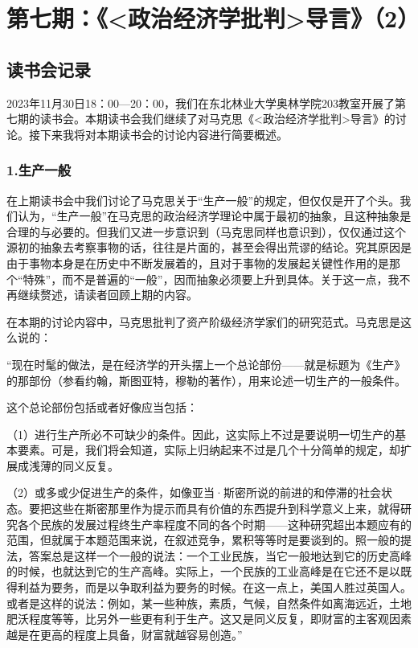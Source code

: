 \documentclass[a4paper,twoside,12pt,AutoFakeBold]{ctexart}
\begin{document}
\section{第七期：《<政治经济学批判>导言》（2）}
\subsection{读书会记录}
2023年11月30日18：00—20：00，我们在东北林业大学奥林学院203教室开展了第七期的读书会。本期读书会我们继续了对马克思《<政治经济学批判>导言》的讨论。接下来我将对本期读书会的讨论内容进行简要概述。
\subsubsection{1.生产一般}
在上期读书会中我们讨论了马克思关于“生产一般”的规定，但仅仅是开了个头。我们认为，“生产一般”在马克思的政治经济学理论中属于最初的抽象，且这种抽象是合理的与必要的。但我们又进一步意识到（马克思同样也意识到），仅仅通过这个源初的抽象去考察事物的话，往往是片面的，甚至会得出荒谬的结论。究其原因是由于事物本身是在历史中不断发展着的，且对于事物的发展起关键性作用的是那个“特殊”，而不是普遍的“一般”，因而抽象必须要上升到具体。关于这一点，我不再继续赘述，请读者回顾上期的内容。

在本期的讨论内容中，马克思批判了资产阶级经济学家们的研究范式。马克思是这么说的：
\begin{adjustwidth}{2em}{2em}
    \qquad\fangsong
“现在时髦的做法，是在经济学的开头摆上一个总论部份——就是标题为《生产》的那部份（参看约翰，斯图亚特，穆勒的著作），用来论述一切生产的一般条件。
    
这个总论部份包括或者好像应当包括：

（1）进行生产所必不可缺少的条件。因此，这实际上不过是要说明一切生产的基本要素。可是，我们将会知道，实际上归纳起来不过是几个十分简单的规定，却扩展成浅薄的同义反复。

（2）或多或少促进生产的条件，如像亚当·斯密所说的前进的和停滞的社会状态。要把这些在斯密那里作为提示而具有价值的东西提升到科学意义上来，就得研究各个民族的发展过程终生产率程度不同的各个时期——这种研究超出本题应有的范围，但就属于本题范围来说，在叙述竞争，累积等等时是要谈到的。照一般的提法，答案总是这样一个一般的说法：一个工业民族，当它一般地达到它的历史高峰的时候，也就达到它的生产高峰。实际上，一个民族的工业高峰是在它还不是以既得利益为要务，而是以争取利益为要务的时候。在这一点上，美国人胜过英国人。或者是这样的说法：例如，某一些种族，素质，气候，自然条件如离海远近，土地肥沃程度等等，比另外一些更有利于生产。这又是同义反复，即财富的主客观因素越是在更高的程度上具备，财富就越容易创造。”
\end{adjustwidth}
\vspace{0.3cm}
\end{document}
